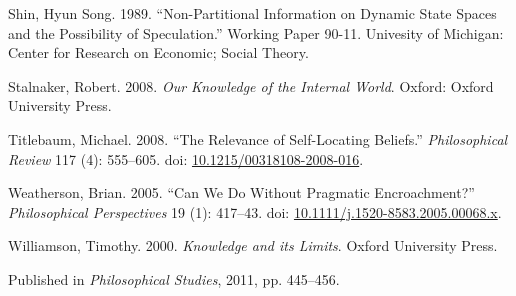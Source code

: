 \documentclass[
  10pt,
  letterpaper,
  DIV=11,
  numbers=noendperiod,
  twoside]{scrartcl}
\newlength{\cslhangindent}
\newenvironment{CSLReferences}[2] %
 {\begin{list}{}{%
  \setlength{\itemindent}{0pt}
  \setlength{\leftmargin}{0pt}
  \setlength{\parsep}{0pt}
  \ifodd #1
   \setlength{\leftmargin}{\cslhangindent}
   \setlength{\itemindent}{-1\cslhangindent}
  \fi
  \setlength{\itemsep}{#2\baselineskip}}}
 {\end{list}}
\begin{document}
\begin{CSLReferences}{1}{0}
Shin, Hyun Song. 1989. {``Non-Partitional Information on Dynamic State
Spaces and the Possibility of Speculation.''} Working Paper 90-11.
Univesity of Michigan: Center for Research on Economic; Social Theory.

Stalnaker, Robert. 2008. \emph{Our Knowledge of the Internal World}.
Oxford: Oxford University Press.

Titlebaum, Michael. 2008. {``The Relevance of Self-Locating Beliefs.''}
\emph{Philosophical Review} 117 (4): 555--605. doi:
\href{https://doi.org/10.1215/00318108-2008-016}{10.1215/00318108-2008-016}.

Weatherson, Brian. 2005. {``{Can We Do Without Pragmatic
Encroachment?}''} \emph{Philosophical Perspectives} 19 (1): 417--43.
doi:
\href{https://doi.org/10.1111/j.1520-8583.2005.00068.x}{10.1111/j.1520-8583.2005.00068.x}.

Williamson, Timothy. 2000. \emph{{Knowledge and its Limits}}. Oxford
University Press.

\end{CSLReferences}



\noindent Published in\emph{
Philosophical Studies}, 2011, pp. 445–456.
\end{document}
